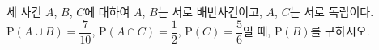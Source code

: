 세 사건 $A$, $B$, $C$에 대하여 $A$, $B$는 서로 배반사건이고, $A$, $C$는 서로 독립이다. $\mathrm{P}(A\cup B)=\dfrac{7}{10}$, $\mathrm{P}(A\cap C)=\dfrac{1}{2}$, $\mathrm{P}(C)=\dfrac{5}{6}$일 때, $\mathrm{P}(B)$를 구하시오.
